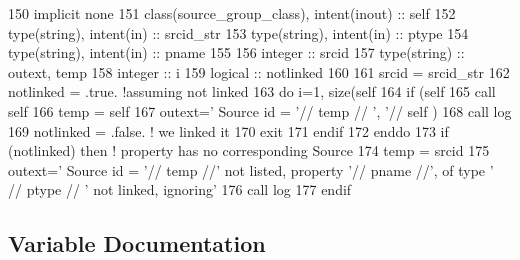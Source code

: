 \begin{DoxyCode}
150     \textcolor{keywordtype}{implicit none}
151     \textcolor{keywordtype}{class}(source\_group\_class), \textcolor{keywordtype}{intent(inout)} :: self
152     \textcolor{keywordtype}{type}(string), \textcolor{keywordtype}{intent(in)} :: srcid\_str
153     \textcolor{keywordtype}{type}(string), \textcolor{keywordtype}{intent(in)} :: ptype
154     \textcolor{keywordtype}{type}(string), \textcolor{keywordtype}{intent(in)} :: pname
155 
156     \textcolor{keywordtype}{integer} :: srcid
157     \textcolor{keywordtype}{type}(string) :: outext, temp
158     \textcolor{keywordtype}{integer} :: i
159     \textcolor{keywordtype}{logical} :: notlinked
160 
161     srcid = srcid\_str%
162     notlinked = .true.  \textcolor{comment}{!assuming not linked}
163     \textcolor{keywordflow}{do} i=1, \textcolor{keyword}{size}(self%
164         \textcolor{keywordflow}{if} (self%
165             \textcolor{keyword}{call }self%
166             temp = self%
167             outext=\textcolor{stringliteral}{'      Source id = '}// temp // \textcolor{stringliteral}{', '}// self%
      )%
168             \textcolor{keyword}{call }log%
169             notlinked = .false. \textcolor{comment}{! we linked it}
170             \textcolor{keywordflow}{exit}
171 \textcolor{keywordflow}{        endif}
172 \textcolor{keywordflow}{    enddo}
173     \textcolor{keywordflow}{if} (notlinked) \textcolor{keywordflow}{then} \textcolor{comment}{! property has no corresponding Source}
174         temp = srcid
175         outext=\textcolor{stringliteral}{'      Source id = '}// temp //\textcolor{stringliteral}{' not listed, property '}// pname //\textcolor{stringliteral}{', of type '} // ptype // \textcolor{stringliteral}{'
       not linked, ignoring'}
176         \textcolor{keyword}{call }log%
177 \textcolor{keywordflow}{    endif}
\end{DoxyCode}


\subsection{Variable Documentation}
\mbox{\label{namespacesources__mod_ab04ea8c02cdf83a1a356c8710ae811d5}} 
